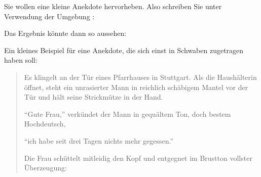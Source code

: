     \begin{Example}
      Sie wollen eine kleine Anekdote hervorheben. Also schreiben Sie
      unter Verwendung der Umgebung :%
        Das Ergebnis könnte dann so aussehen:
        \begin{ShowOutput}
          \iftrue%
            Ein kleines Beispiel für eine Anekdote, die sich einst
            in Schwaben zugetragen haben soll:
          \fi
          \begin{quotation}
            Es klingelt an der Tür eines Pfarrhauses in 
            Stuttgart. Als die Haushälterin öffnet, steht ein 
            unrasierter Mann in reichlich schäbigem
            Mantel vor der Tür und hält seine Strickmütze in
            der Hand.

            "`Gute Frau,"' verkündet der Mann in gequältem Ton,
            doch bestem Hochdeutsch, 
            \iffalse%
              während er verlegen von einem Bein auf das andere wechselt, 
            \fi
            "`ich habe 
            seit drei Tagen nichts mehr gegessen."'

            Die Frau schüttelt mitleidig den Kopf und entgegnet
            im Brustton vollster Überzeugung:


\end{quotation}
\end{ShowOutput}
\end{Example}
